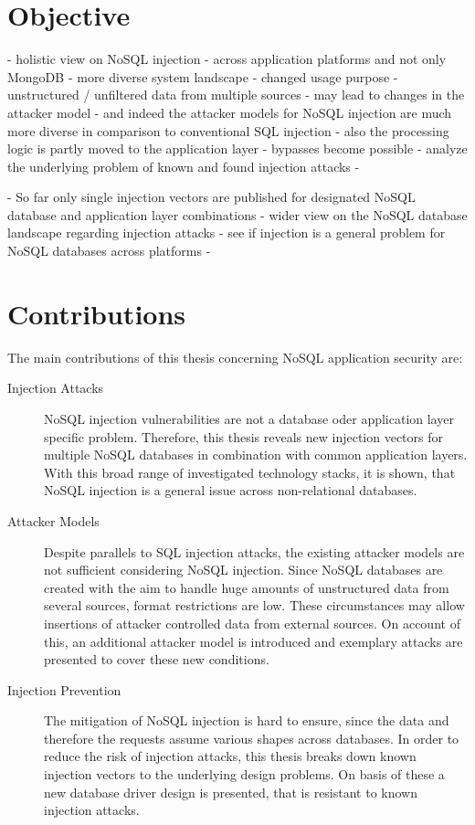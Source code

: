 \section{Objective}

- holistic view on NoSQL injection - across application platforms and not only MongoDB
- more diverse system landscape - changed usage purpose - unstructured / unfiltered data from multiple sources
- may lead to changes in the attacker model
- and indeed the attacker models for NoSQL injection are much more diverse in comparison to conventional SQL injection
- also the processing logic is partly moved to the application layer
- bypasses become possible
- analyze the underlying problem of known and found injection attacks
- 

- So far only single injection vectors are published for designated NoSQL database and application layer combinations
- wider view on the NoSQL database landscape regarding injection attacks
- see if injection is a general problem for NoSQL databases across platforms
- 


\section{Contributions}

The main contributions of this thesis concerning NoSQL application security are:
\begin{description}
\item [Injection Attacks] NoSQL injection vulnerabilities are not a database oder application layer specific problem. Therefore, this thesis reveals new injection vectors for multiple NoSQL databases in combination with common application layers. With this broad range of investigated technology stacks, it is shown, that NoSQL injection is a general issue across non-relational databases.
\item [Attacker Models] Despite parallels to SQL injection attacks, the existing attacker models are not sufficient considering NoSQL injection. Since NoSQL databases are created with the aim to handle huge amounts of unstructured data from several sources, format restrictions are low. These circumstances may allow insertions of attacker controlled data from external sources. On account of this, an additional attacker model is introduced and exemplary attacks are presented to cover these new conditions.
\item [Injection Prevention] The mitigation of NoSQL injection is hard to ensure, since the data and therefore the requests assume various shapes across databases. In order to reduce the risk of injection attacks, this thesis breaks down known injection vectors to the underlying design problems. On basis of these a new database driver design is presented, that is resistant to known injection attacks.
\end{description}

